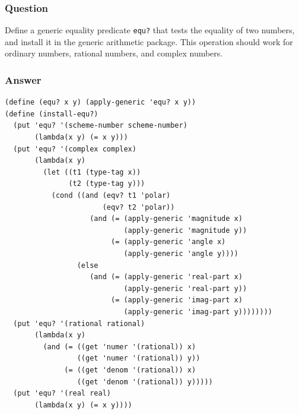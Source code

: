 \documentclass[final,fleqn,titlepage,twoside]{article}
\begin{document}
\subsubsection{Question}
\label{sec:org2ac11a7}
Define a generic equality predicate \texttt{equ?} that tests the equality of
two numbers, and install it in the generic arithmetic package. This operation
should work for ordinary numbers, rational numbers, and complex numbers.

\subsubsection{Answer}
\label{sec:org01fbda0}
\begin{verbatim}
(define (equ? x y) (apply-generic 'equ? x y))
(define (install-equ?)
  (put 'equ? '(scheme-number scheme-number)
       (lambda(x y) (= x y)))
  (put 'equ? '(complex complex)
       (lambda(x y)
         (let ((t1 (type-tag x))
               (t2 (type-tag y)))
           (cond ((and (eqv? t1 'polar)
                       (eqv? t2 'polar))
                    (and (= (apply-generic 'magnitude x)
                            (apply-generic 'magnitude y))
                         (= (apply-generic 'angle x)
                            (apply-generic 'angle y))))
                 (else
                    (and (= (apply-generic 'real-part x)
                            (apply-generic 'real-part y))
                         (= (apply-generic 'imag-part x)
                            (apply-generic 'imag-part y))))))))
  (put 'equ? '(rational rational)
       (lambda(x y)
         (and (= ((get 'numer '(rational)) x)
                 ((get 'numer '(rational)) y))
              (= ((get 'denom '(rational)) x)
                 ((get 'denom '(rational)) y)))))
  (put 'equ? '(real real)
       (lambda(x y) (= x y))))
\end{verbatim}
\end{document}
